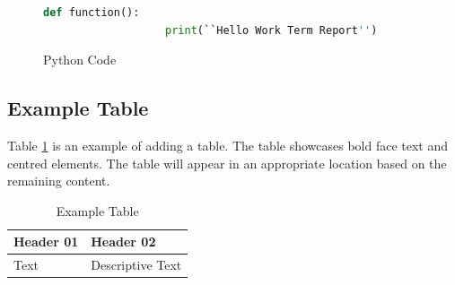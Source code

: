         \begin{figure}[!ht]
            \begin{lstlisting}[language=Python]
                def function():
            	   print(``Hello Work Term Report'')
            \end{lstlisting}
            \caption{Python Code}
            \label{fig:figure02}
        \end{figure}
	
	\subsection{Example Table}
	   Table \ref{table:table01} is an example of adding a table. The table showcases bold face text and centred elements. The table will appear in an appropriate location based on the remaining content.

        \begin{table}[ht]
            \begin{center}
                \begin{tabular}{|l|l|}
                    \hline
                    \textbf{Header 01} & \textbf{Header 02} \\ \hline
                    Text               & Descriptive Text   \\ \hline
                \end{tabular}
                \caption{Example Table}
                \label{table:table01}
            \end{center}
        \end{table}
